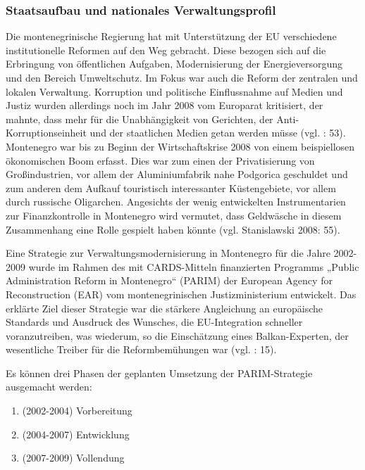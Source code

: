\subsubsection{Staatsaufbau und nationales Verwaltungsprofil}

Die montenegrinische Regierung hat mit Unterstützung der EU verschiedene institutionelle Reformen auf den Weg gebracht. Diese bezogen sich auf die Erbringung von öffentlichen Aufgaben, Modernisierung der Energieversorgung und den Bereich Umweltschutz. Im Fokus war auch die Reform der zentralen und lokalen Verwaltung. Korruption und politische Einflussnahme auf Medien und Justiz wurden allerdings noch im Jahr 2008 vom Europarat kritisiert, der mahnte, dass mehr für die Unabhängigkeit von Gerichten, der Anti-Korruptionseinheit und der staatlichen Medien getan werden müsse (vgl. \cite{stanislaw}: 53). Montenegro war bis zu Beginn der Wirtschaftskrise 2008 von einem beispiellosen ökonomischen Boom erfasst. Dies war zum einen der Privatisierung von Großindustrien, vor allem der Aluminiumfabrik nahe Podgorica geschuldet und zum anderen dem Aufkauf touristisch interessanter Küstengebiete, vor allem durch russische Oligarchen. Angesichts der wenig entwickelten Instrumentarien zur Finanzkontrolle in Montenegro wird vermutet, dass Geldwäsche in diesem Zusammenhang eine Rolle gespielt haben könnte (vgl. Stanislawski 2008: 55).\par
Eine Strategie zur Verwaltungsmodernisierung in Montenegro für die Jahre 2002-2009 wurde im Rahmen des mit CARDS-Mitteln finanzierten Programms „Public Administration Reform in Montenegro“ (PARIM) der European Agency for Reconstruction (EAR) vom montenegrinischen Justizministerium entwickelt. Das erklärte Ziel dieser Strategie war die stärkere Angleichung an europäische Standards und Ausdruck des Wunsches, die EU-Integration schneller voranzutreiben, was wiederum, so die Einschätzung eines Balkan-Experten, der wesentliche Treiber für die Reformbemühungen war (vgl. \cite{dzamuk}: 15).\par

Es können drei Phasen der geplanten Umsetzung der PARIM-Strategie ausgemacht werden:
\begin{enumerate}[label=Phase {\Roman*}:,align=left,  leftmargin=*] \itemsep1pt \parskip0pt 
\item (2002-2004) Vorbereitung
\item (2004-2007) Entwicklung
\item  (2007-2009) Vollendung
\end{enumerate}

